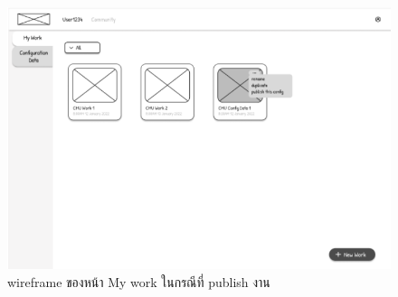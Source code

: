\begin{mypara}
\begin{itemize}
\begin{itemize}
        \begin{figure}[H]
          \centering
          \includegraphics[scale=0.6]{my_work_publish.png} 
          \caption{wireframe ของหน้า My work ในกรณีที่ publish งาน}
          \label{fig:WireframeMyWorkPublish}
        \end{figure}


\end{itemize}
\end{itemize}
\end{mypara}
